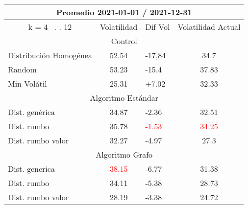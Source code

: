 \documentclass[12pt,a4paper]{article}
\begin{document}
\begin{table}[H]
\centering
\begin{tabular}{l|c|l|c|} 
\hline
\multicolumn{4}{c}{{\cellcolor[rgb]{0.635,0.647,0.788}}Promedio 2021-01-01 / 2021-12-31}                                                                                            \\ 
\hline
\multicolumn{1}{c|}{{\cellcolor[rgb]{0.635,0.647,0.788}}k = 4~ . . 12} & Volatilidad                       & Dif Vol                           & Volatilidad Actual                 \\ 
\hline
\multicolumn{4}{c}{{\cellcolor[rgb]{0.796,0.808,0.984}}Control}                                                                                                                     \\ 
\hline
\rowcolor[rgb]{0.925,0.957,1} Distribución Homogénea                   & 52.54                             & -17,84                            & 34.7                               \\
\rowcolor[rgb]{0.855,0.91,0.988} Random                                & 53.23                             & -15.4                             & 37.83                              \\
\rowcolor[rgb]{0.925,0.957,1} Min Volátil                              & 25.31                             & +7.02                             & 32.33                              \\ 
\hline
\multicolumn{4}{c}{{\cellcolor[rgb]{0.796,0.808,0.984}}Algoritmo Estándar}                                                                                                          \\ 
\hline
\rowcolor[rgb]{0.925,0.957,1} Dist. genérica                           & 34.87                             & -2.36                             & 32.51                              \\
\rowcolor[rgb]{0.855,0.91,0.988} Dist. rumbo                           & 35.78                             & \textcolor{red}{-1.53}            & \textcolor{red}{34.25}             \\
\rowcolor[rgb]{0.925,0.957,1} Dist. rumbo valor                        & 32.27                             & -4.97                             & 27.3                               \\ 
\hline
\multicolumn{4}{c}{{\cellcolor[rgb]{0.796,0.808,0.984}}Algoritmo Grafo}                                                                                                             \\ 
\hline
\rowcolor[rgb]{0.925,0.957,1} Dist. generica                           & \textcolor{red}{38.15}            & \textcolor[rgb]{0,0.502,0}{-6.77} & 31.38                              \\
\rowcolor[rgb]{0.855,0.91,0.988} Dist. rumbo                           & 34.11                             & -5.38                             & 28.73                              \\
\rowcolor[rgb]{0.925,0.957,1} Dist. rumbo valor                        & \textcolor[rgb]{0,0.502,0}{28.19} & -3.38                             & \textcolor[rgb]{0,0.502,0}{24.72} 
\end{tabular}
\end{table}
\end{document}
